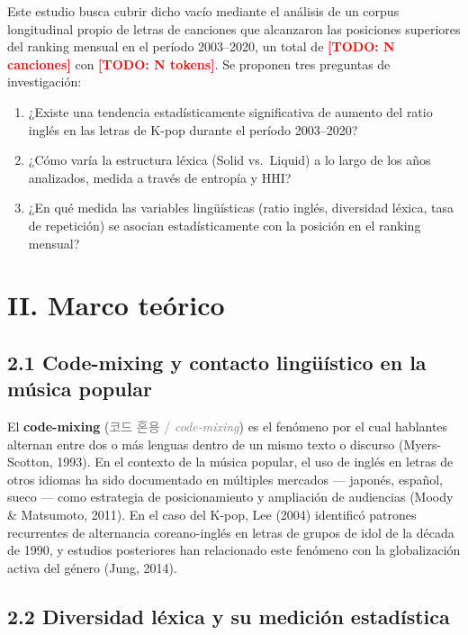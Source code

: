 \documentclass[11pt,a4paper]{article}
\newcommand{\term}[3]{\textbf{#1} (\textcolor{gray}{#2 / \textit{#3}})}
\newcommand{\todo}[1]{\textcolor{red}{\textbf{[TODO: #1]}}}
\begin{document}
Este estudio busca cubrir dicho vacío mediante el análisis de un corpus
longitudinal propio de letras de canciones que alcanzaron las posiciones
superiores del ranking mensual en el período 2003--2020, un total de
\todo{N canciones} con \todo{N tokens}.
Se proponen tres preguntas de investigación:

\begin{enumerate}[leftmargin=1.8em]
    \item ¿Existe una tendencia estadísticamente significativa de aumento del
    ratio inglés en las letras de K-pop durante el período 2003--2020?
    \item ¿Cómo varía la estructura léxica (Solid vs.\ Liquid) a lo largo de
    los años analizados, medida a través de entropía y HHI?
    \item ¿En qué medida las variables lingüísticas (ratio inglés, diversidad
    léxica, tasa de repetición) se asocian estadísticamente con la posición
    en el ranking mensual?
\end{enumerate}

\section*{II. Marco teórico}

\subsection*{2.1 Code-mixing y contacto lingüístico en la música popular}

El \term{code-mixing}{코드 혼용}{code-mixing} es el fenómeno por el cual
hablantes alternan entre dos o más lenguas dentro de un mismo texto o discurso
(Myers-Scotton, 1993).
En el contexto de la música popular, el uso de inglés en letras de otros idiomas
ha sido documentado en múltiples mercados --- japonés, español, sueco ---
como estrategia de posicionamiento y ampliación de audiencias (Moody \& Matsumoto, 2011).
En el caso del K-pop, Lee (2004) identificó patrones recurrentes de alternancia
coreano-inglés en letras de grupos de idol de la década de 1990, y estudios
posteriores han relacionado este fenómeno con la globalización activa del género
(Jung, 2014).

\subsection*{2.2 Diversidad léxica y su medición estadística}
\end{document}
